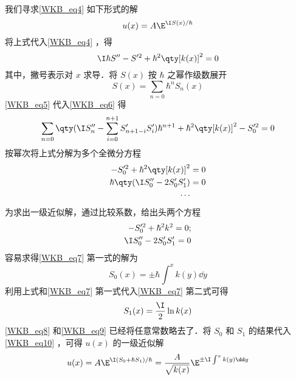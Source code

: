 我们寻求\autoref{WKB_eq4} 如下形式的解
\begin{equation}\label{WKB_eq10}
u(x)=A\E^{\I S(x)/\hbar}
\end{equation}
将上式代入\autoref{WKB_eq4} ，得
\begin{equation}\label{WKB_eq6}
\I\hbar S''-S'^2+\hbar^2\qty[k(x)]^2=0
\end{equation}
其中，撇号表示对 $x$ 求导．将 $S(x)$ 按 $\hbar$ 之幂作级数展开
\begin{equation}\label{WKB_eq5}
S(x)=\sum_{n=0}\hbar^nS_n(x)
\end{equation}
\autoref{WKB_eq5} 代入\autoref{WKB_eq6} 得
\begin{equation}
\sum_{n=0}\qty(\I S_n''-\sum_{i=0}^{n+1}S_{n+1-i}'S_i')\hbar^{n+1}+\hbar^2\qty[k(x)]^2-S_0'^2=0
\end{equation}
按幂次将上式分解为多个全微分方程
\begin{equation}
\begin{aligned}
-S_0'^2+\hbar^2\qty[k(x)]^2&=0\\
\hbar\qty(\I S_0''-2S_0'S_1')&=0\\
\cdots
\end{aligned}
\end{equation}
为求出一级近似解，通过比较系数，给出头两个方程
\begin{equation}\label{WKB_eq7}
\begin{aligned}
-S_0'^2+\hbar^2k^2=0;\\
\I S_0''-2S_0'S_1'=0
\end{aligned}
\end{equation}
容易求得\autoref{WKB_eq7} 第一式的解为
\begin{equation}\label{WKB_eq8}
S_0(x)=\pm\hbar\int^x k(y)\dd y
\end{equation}
利用上式和\autoref{WKB_eq7} 第一式代入\autoref{WKB_eq7} 第二式可得
\begin{equation}\label{WKB_eq9}
S_1(x)=\frac{\I}{2}\ln k(x)
\end{equation}
\autoref{WKB_eq8} 和\autoref{WKB_eq9} 已经将任意常数略去了．将 $S_0$ 和 $S_1$ 的结果代入\autoref{WKB_eq10} ，可得 $u(x)$ 的一级近似解
\begin{equation}\label{WKB_eq11}
u(x)=A\E^{\I(S_0+\hbar S_1)/\hbar}=\frac{A}{\sqrt{k(x)}} \E^{\pm\I\int^x k(y)\dd y}
\end{equation}
